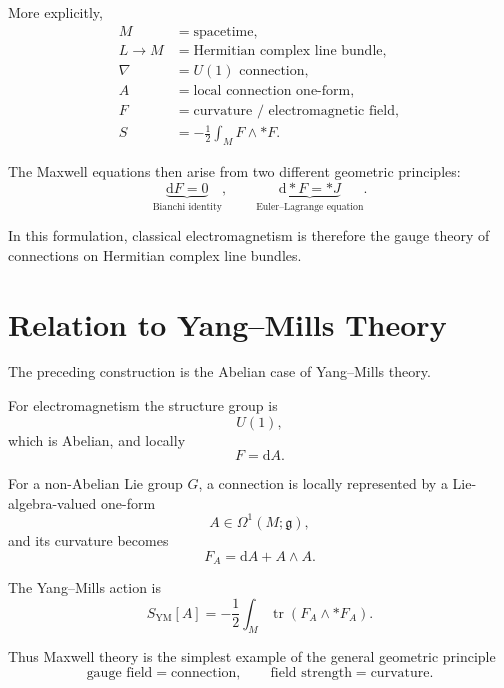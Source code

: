 \documentclass[11pt,a4paper]{article}
\newcommand{\dd}{\mathrm{d}}
\begin{document}
More explicitly,
\[
\begin{aligned}
M
&=
\text{spacetime},
\\
L\to M
&=
\text{Hermitian complex line bundle},
\\
\nabla
&=
\text{$U(1)$ connection},
\\
A
&=
\text{local connection one-form},
\\
F
&=
\text{curvature / electromagnetic field},
\\
S
&=
-\frac12\int_M F\wedge *F.
\end{aligned}
\]

The Maxwell equations then arise from two different geometric
principles:
\[
\boxed{
\underbrace{\dd F=0}_{\text{Bianchi identity}},
\qquad
\underbrace{\dd *F=*J}_{\text{Euler--Lagrange equation}}.
}
\]

In this formulation, classical electromagnetism is therefore the
gauge theory of connections on Hermitian complex line bundles.

\section{Relation to Yang--Mills Theory}

The preceding construction is the Abelian case of Yang--Mills
theory.

For electromagnetism the structure group is
\[
U(1),
\]
which is Abelian, and locally
\[
F=\dd A.
\]

For a non-Abelian Lie group $G$, a connection is locally represented
by a Lie-algebra-valued one-form
\[
A\in\Omega^1(M;\mathfrak{g}),
\]
and its curvature becomes
\[
F_A
=
\dd A+A\wedge A.
\]

The Yang--Mills action is
\[
S_{\mathrm{YM}}[A]
=
-\frac12
\int_M
\operatorname{tr}
\left(
F_A\wedge *F_A
\right).
\]

Thus Maxwell theory is the simplest example of the general
geometric principle
\[
\boxed{
\text{gauge field}
=
\text{connection},
\qquad
\text{field strength}
=
\text{curvature}.
}
\]
\end{document}
